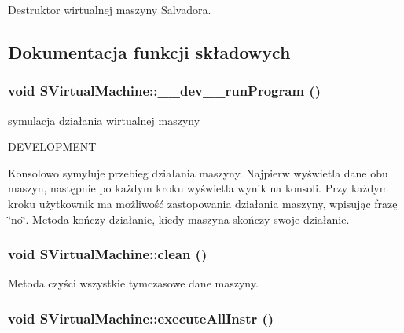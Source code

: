 Destruktor wirtualnej maszyny Salvadora. 

\subsection{Dokumentacja funkcji składowych}
\hypertarget{classSVirtualMachine_d07f353daaf626f5efeb8bd34818db75}{
\subsubsection[{\_\-\_\-dev\_\-\_\-runProgram}]{\setlength{\rightskip}{0pt plus 5cm}void SVirtualMachine::\_\-\_\-dev\_\-\_\-runProgram ()}}
\label{classSVirtualMachine_d07f353daaf626f5efeb8bd34818db75}


symulacja działania wirtualnej maszyny 

DEVELOPMENT

Konsolowo symyluje przebieg działania maszyny. Najpierw wyświetla dane obu maszyn, następnie po każdym kroku wyświetla wynik na konsoli. Przy każdym kroku użytkownik ma możliwość zastopowania działania maszyny, wpisując frazę \char`\"{}no\char`\"{}. Metoda kończy działanie, kiedy maszyna skończy swoje działanie. \hypertarget{classSVirtualMachine_85f2b4a688a077283010a11145289110}{
\subsubsection[{clean}]{\setlength{\rightskip}{0pt plus 5cm}void SVirtualMachine::clean ()}}
\label{classSVirtualMachine_85f2b4a688a077283010a11145289110}


Metoda czyści wszystkie tymczasowe dane maszyny. \hypertarget{classSVirtualMachine_f3874f10dac15f27b23dc4b976271413}{
\subsubsection[{executeAllInstr}]{\setlength{\rightskip}{0pt plus 5cm}void SVirtualMachine::executeAllInstr ()}}
\label{classSVirtualMachine_f3874f10dac15f27b23dc4b976271413}


